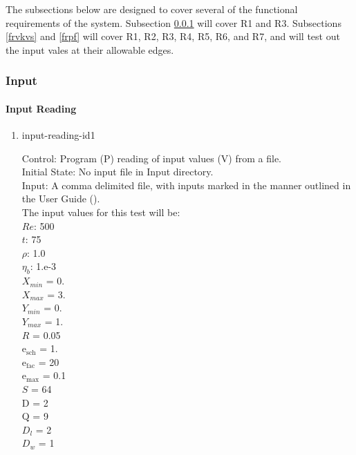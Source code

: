 \documentclass[12pt, titlepage]{article}
\begin{document}
\label{testfr}

The subsections below are designed to cover several of the functional requirements of the system. Subsection \ref{frinput} will cover R1 and R3. Subsections \ref{frvkvs} and \ref{frpf} will cover R1, R2, R3, R4, R5, R6, and R7, and will test out the input vales at their allowable edges.

\subsubsection{Input}
\label{frinput}
		
\paragraph{Input Reading}

\begin{enumerate}

\item{input-reading-id1\\}

Control: Program (P) reading of input values (V) from a file.\\
					
Initial State: No input file in Input directory.\\
					
Input: A comma delimited file, with inputs marked in the manner outlined in the User Guide (\citet{LBM_UserGuide_PM}).\\The input values for this test will be:\\$Re$: 500\\
$t$: 75\\
$\rho$: 1.0\\
$\eta_b$: 1.e-3\\
$X_{min}$ = 0.\\
$X_{max}$ = 3.\\
$Y_{min}$ = 0.\\
$Y_{max}$ = 1.\\
$R$ = 0.05\\
$\mathrm{e_{sch}}$ = 1.\\
$\mathrm{e_{fac}}$ = 20\\
$\mathrm{e_{max}}$ = 0.1\\
$S$ = 64\\
$\mathrm{D}$ = 2\\
$\mathrm{Q}$ = 9\\
$D_{l}$ = 2\\
$D_{w}$ = 1\\


\end{enumerate}
\end{document}
